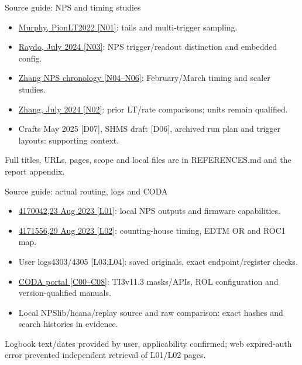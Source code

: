 \documentclass[aspectratio=169,11pt]{beamer}
\newcommand{\source}[1]{\par\vfill{\scriptsize\color{muted}#1\par}}
\begin{document}
\begin{frame}{Source guide: NPS and timing studies}
\small\begin{itemize}\setlength\itemsep{3mm}
\item \href{https://redmine.jlab.org/attachments/download/1499/EDTM_Study_Report.pdf}{Murphy, PionLT2022 [N01]}: tails and multi-trigger sampling.
\item \href{https://indico.jlab.org/event/866/contributions/14914/subcontributions/234/attachments/11505/17805/NPS_July17_2024_Raydo.pdf}{Raydo, July 2024 [N03]}: NPS trigger/readout distinction and embedded config.
\item \href{https://redmine.jlab.org/issues/837}{Zhang NPS chronology [N04--N06]}: February/March timing and scaler studies.
\item \href{https://indico.jlab.org/event/866/contributions/14918/subcontributions/283/attachments/11529/17843/Deadtime\%20and\%20Efficiency.pdf}{Zhang, July 2024 [N02]}: prior LT/rate comparisons; units remain qualified.
\item Crafts May 2025 [D07], SHMS draft [D06], archived run plan and trigger layouts: supporting context.
\end{itemize}\source{Full titles, URLs, pages, scope and local files are in REFERENCES.md and the report appendix.}
\end{frame}

\begin{frame}{Source guide: actual routing, logs and CODA}
\small\begin{itemize}\setlength\itemsep{3mm}
\item \href{https://logbooks.jlab.org/entry/4170042}{4170042,23 Aug 2023 [L01]}: local NPS outputs and firmware capabilities.
\item \href{https://logbooks.jlab.org/entry/4171556}{4171556,29 Aug 2023 [L02]}: counting-house timing, EDTM OR and ROC1 map.
\item User logs4303/4305 [L03,L04]: saved originals, exact endpoint/register checks.
\item \href{https://coda.jlab.org/drupal/}{CODA portal [C00--C08]}: TI3v11.3 masks/APIs, ROL configuration and version-qualified manuals.
\item Local NPSlib/hcana/replay source and raw comparison: exact hashes and search histories in evidence.
\end{itemize}\source{Logbook text/dates provided by user, applicability confirmed; web expired-auth error prevented independent retrieval of L01/L02 pages.}
\end{frame}
\end{document}
